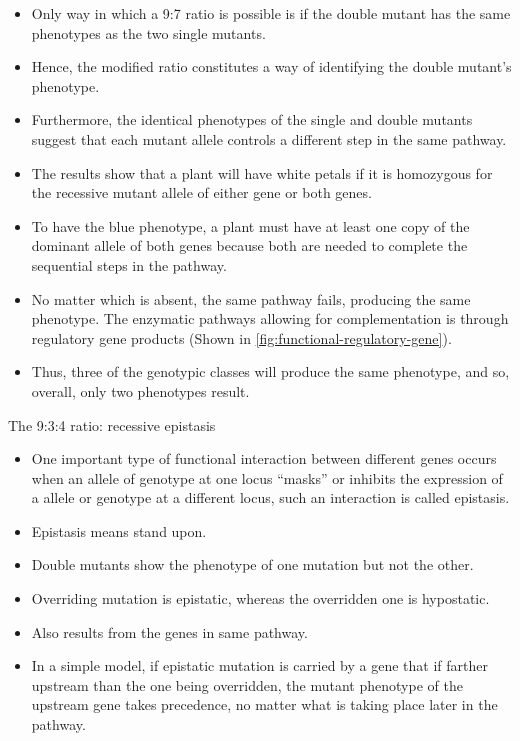 \documentclass[11pt,dvipsnames,ignorenonframetext,aspectratio=169]{beamer}
\providecommand{\tightlist}{%
  \setlength{\itemsep}{0pt}\setlength{\parskip}{0pt}}
\begin{document}
\begin{frame}{}
\protect\hypertarget{section-14}{}
\begin{itemize}
\tightlist
\item
  Only way in which a 9:7 ratio is possible is if the double mutant has
  the same phenotypes as the two single mutants.
\item
  Hence, the modified ratio constitutes a way of identifying the double
  mutant's phenotype.
\item
  Furthermore, the identical phenotypes of the single and double mutants
  suggest that each mutant allele controls a different step in the same
  pathway.
\item
  The results show that a plant will have white petals if it is
  homozygous for the recessive mutant allele of either gene or both
  genes.
\item
  To have the blue phenotype, a plant must have at least one copy of the
  dominant allele of both genes because both are needed to complete the
  sequential steps in the pathway.
\item
  No matter which is absent, the same pathway fails, producing the same
  phenotype. The enzymatic pathways allowing for complementation is
  through regulatory gene products (Shown in
  \ref{fig:functional-regulatory-gene}).
\item
  Thus, three of the genotypic classes will produce the same phenotype,
  and so, overall, only two phenotypes result.
\end{itemize}
\end{frame}

\begin{frame}{The 9:3:4 ratio: recessive epistasis}
\protect\hypertarget{the-934-ratio-recessive-epistasis}{}
\begin{itemize}
\tightlist
\item
  One important type of functional interaction between different genes
  occurs when an allele of genotype at one locus ``masks'' or inhibits
  the expression of a allele or genotype at a different locus, such an
  interaction is called epistasis.
\item
  Epistasis means stand upon.
\item
  Double mutants show the phenotype of one mutation but not the other.
\item
  Overriding mutation is epistatic, whereas the overridden one is
  hypostatic.
\item
  Also results from the genes in same pathway.
\item
  In a simple model, if epistatic mutation is carried by a gene that if
  farther upstream than the one being overridden, the mutant phenotype
  of the upstream gene takes precedence, no matter what is taking place
  later in the pathway.
\end{itemize}
\end{frame}
\end{document}
